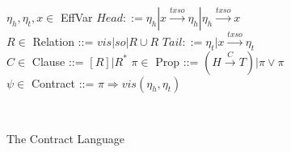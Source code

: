 \begin{figure}[h]
	\centering
	\begin{minipage}{.75\textwidth}
		$\eta_h,\eta_t, x \in$ EffVar  \hspace {35.5 mm} $Head    ::=    \eta_h | x \xrightarrow{txso} \eta_h | \eta_h \xrightarrow{txso} x$ \\
		$R \in $ Relation ::= $vis | so | R \cup R $ \hspace{20 mm}
		$Tail ::= \eta_t | x \xrightarrow{txso} \eta_t $ \\
		$C \in $ Clause ::= $[R] | R^*$ \hspace{30 mm}		
		$\pi \in$ Prop ::= $(H \xrightarrow{C} T) | \pi \vee \pi$ \\
		$\psi \in$ Contract ::= $ \pi \Rightarrow vis (\eta_h,\eta_t)$ \\
	\end{minipage}
	\\
	\hrulefill
	\caption{The Contract Language}
\end{figure}
